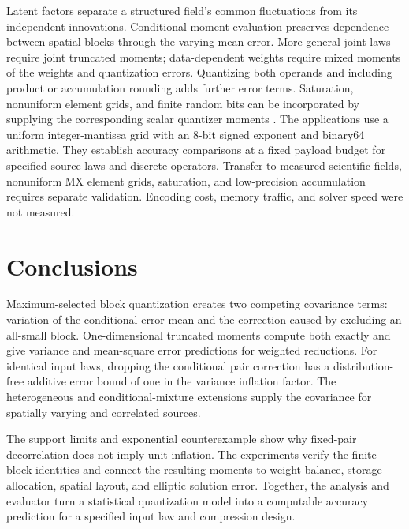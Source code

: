 Latent factors separate a structured field's common fluctuations from its
independent innovations. Conditional moment evaluation preserves dependence
between spatial blocks through the varying mean error. More general joint
laws require joint truncated moments; data-dependent weights require mixed moments of
the weights and quantization errors. Quantizing both operands and including
product or accumulation rounding adds further error terms. Saturation,
nonuniform element grids, and finite random bits can be incorporated by
supplying the corresponding scalar quantizer moments
\cite{elarar2024}.
The applications use a uniform integer-mantissa grid with an 8-bit signed
exponent and binary64 arithmetic. They establish accuracy comparisons at a
fixed payload budget for specified source laws and discrete operators.
Transfer to measured scientific fields, nonuniform MX element grids,
saturation, and low-precision accumulation requires separate validation.
Encoding cost, memory traffic, and solver speed were not measured.

\section{Conclusions}\label{sec:conclusions}
Maximum-selected block quantization creates two competing covariance terms:
variation of the conditional error mean and the correction caused by
excluding an all-small block. One-dimensional truncated moments compute
both exactly and give variance and mean-square error predictions for
weighted reductions. For identical input laws, dropping the conditional
pair correction has a distribution-free additive error bound of one in
the variance inflation factor. The heterogeneous and conditional-mixture
extensions supply the covariance for spatially varying and correlated sources.

The support limits and exponential counterexample show why fixed-pair
decorrelation does not imply unit inflation. The experiments verify the
finite-block identities and connect the resulting moments to weight
balance, storage allocation, spatial layout, and elliptic solution error.
Together, the analysis and evaluator turn a statistical quantization model
into a computable accuracy prediction for a specified input law and
compression design.

